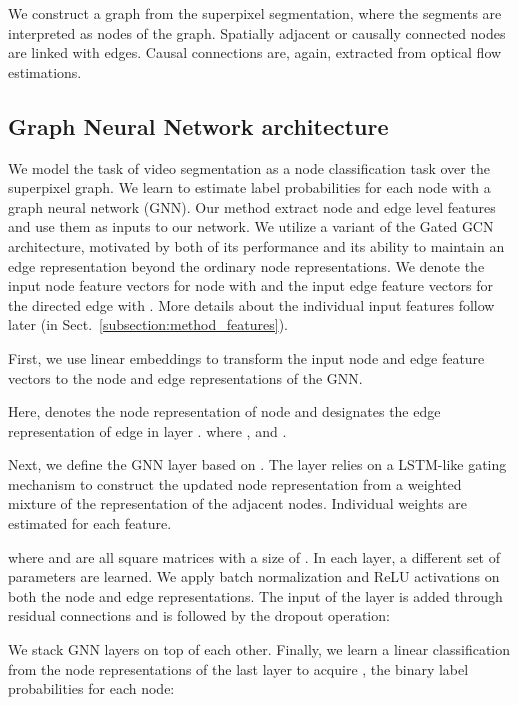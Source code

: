 \documentclass[conference]{IEEEtran}
\begin{document}
We construct a graph from the superpixel segmentation, where the segments are interpreted as nodes of the graph. Spatially adjacent or causally connected nodes are linked with edges. Causal connections are, again, extracted from optical flow estimations.

\subsection{Graph Neural Network architecture}

We model the task of video segmentation as a node classification task over the superpixel graph. We learn to estimate label probabilities for each node with a graph neural network (GNN). Our method extract node and edge level features and use them as inputs to our network. We utilize a variant of the Gated GCN \cite{gnn_gated_gcn} architecture, motivated by both of its performance and its ability to maintain an edge representation beyond the ordinary node representations.
We denote the input node feature vectors for node  with  and the input edge feature vectors for the directed edge  with . More details about the  individual input features follow later (in Sect.~\ref{subsection:method_features}).

First, we use linear embeddings to transform the input node and edge feature vectors to the node and edge representations of the GNN.



\noindent Here,  denotes the node representation of node  and  designates the edge representation of edge  in layer .  where ,  and .

Next, we define the GNN layer based on \cite{gnn_gated_gcn}. The layer relies on a LSTM-like gating mechanism to construct the updated node representation from a weighted mixture of the representation of the adjacent nodes. Individual weights are estimated for each feature.







\noindent where  and  are all square matrices with a size of . In each layer, a different set of parameters are learned.
We apply batch normalization \cite{batch_norm} and ReLU activations on both the node and edge representations. The input of the layer is added through residual connections \cite{residual} and is followed by the dropout operation:




We stack  GNN layers on top of each other. Finally, we learn a linear classification from the node representations of the last layer to acquire , the binary label probabilities for each node:
\end{document}
